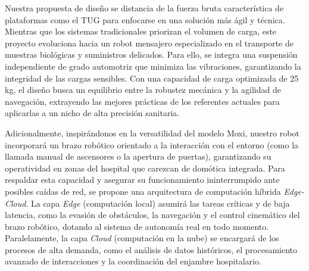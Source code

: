 Nuestra propuesta de diseño se distancia de la fuerza bruta característica de plataformas como el TUG para enfocarse en una solución más ágil y técnica. Mientras que los sistemas tradicionales priorizan el volumen de carga, este proyecto evoluciona hacia un robot mensajero especializado en el transporte de muestras biológicas y suministros delicados. Para ello, se integra una suspensión independiente de grado automotriz que minimiza las vibraciones, garantizando la integridad de las cargas sensibles. Con una capacidad de carga optimizada de 25 kg, el diseño busca un equilibrio entre la robustez mecánica y la agilidad de navegación, extrayendo las mejores prácticas de los referentes actuales para aplicarlas a un nicho de alta precisión sanitaria.

Adicionalmente, inspirándonos en la versatilidad del modelo Moxi, nuestro robot incorporará un brazo robótico orientado a la interacción con el entorno (como la llamada manual de ascensores o la apertura de puertas), garantizando su operatividad en zonas del hospital que carezcan de domótica integrada. Para respaldar esta capacidad y asegurar su funcionamiento ininterrumpido ante posibles caídas de red, se propone una arquitectura de computación híbrida \textit{Edge-Cloud}. La capa \textit{Edge} (computación local) asumirá las tareas críticas y de baja latencia, como la evasión de obstáculos, la navegación y el control cinemático del brazo robótico, dotando al sistema de autonomía real en todo momento. Paralelamente, la capa \textit{Cloud} (computación en la nube) se encargará de los procesos de alta demanda, como el análisis de datos históricos, el procesamiento avanzado de interacciones y la coordinación del enjambre hospitalario.
